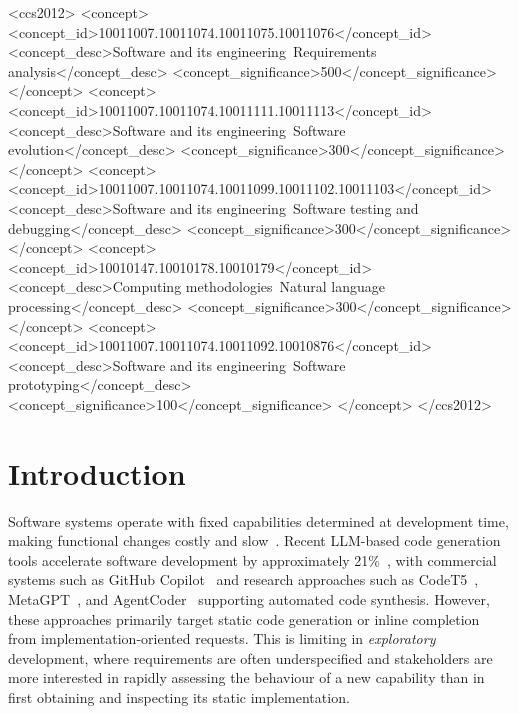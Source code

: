 \documentclass[sigconf,screen]{acmart}
\begin{document}
\begin{CCSXML}
<ccs2012>
   <concept>
       <concept_id>10011007.10011074.10011075.10011076</concept_id>
       <concept_desc>Software and its engineering~Requirements analysis</concept_desc>
       <concept_significance>500</concept_significance>
       </concept>
   <concept>
       <concept_id>10011007.10011074.10011111.10011113</concept_id>
       <concept_desc>Software and its engineering~Software evolution</concept_desc>
       <concept_significance>300</concept_significance>
       </concept>
   <concept>
       <concept_id>10011007.10011074.10011099.10011102.10011103</concept_id>
       <concept_desc>Software and its engineering~Software testing and debugging</concept_desc>
       <concept_significance>300</concept_significance>
       </concept>
   <concept>
       <concept_id>10010147.10010178.10010179</concept_id>
       <concept_desc>Computing methodologies~Natural language processing</concept_desc>
       <concept_significance>300</concept_significance>
       </concept>
   <concept>
       <concept_id>10011007.10011074.10011092.10010876</concept_id>
       <concept_desc>Software and its engineering~Software prototyping</concept_desc>
       <concept_significance>100</concept_significance>
       </concept>
 </ccs2012>
\end{CCSXML}



\maketitle

\section{Introduction}
Software systems operate with fixed capabilities determined at development time, making functional changes costly and slow~\cite{dora2024}. Recent LLM-based code generation tools accelerate software development by approximately 21\%~\cite{paradis2025much}, with commercial systems such as GitHub Copilot~\cite{copilot} and research approaches such as CodeT5~\cite{wang2021codet5}, MetaGPT~\cite{hong2023metagpt}, and AgentCoder~\cite{huang2024agentcoder} supporting automated code synthesis. However, these approaches primarily target static code generation or inline completion from implementation-oriented requests. This is limiting in \textit{exploratory} development, where requirements are often underspecified and stakeholders are more interested in rapidly assessing the behaviour of a new capability than in first obtaining and inspecting its static implementation.
\end{document}
